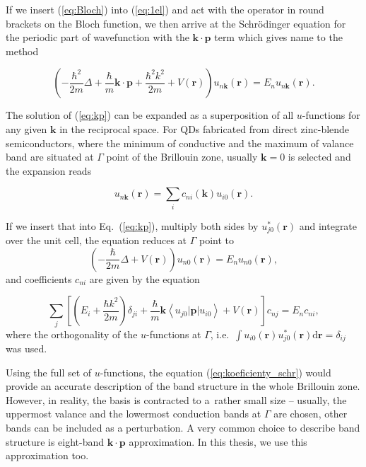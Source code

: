 If we insert (\ref{eq:Bloch}) into (\ref{eq:1el}) and act with the operator in round brackets on the Bloch function, we then arrive at the Schrödinger equation for the periodic part of wavefunction with the $\mathbf{k}\cdot\mathbf{p}$ term which gives name to the method

\begin{equation}
\left(-\frac{\hbar^2}{2m}\Delta+\frac{\hbar}{m}\mathbf{k}\cdot\mathbf{p}+\frac{\hbar^2 k^2}{2m}+V(\mathbf{r})\right)u_{n\mathbf{k}}(\mathbf{r})=E_nu_{n\mathbf{k}}(\mathbf{r}). \label{eq:kp}
\end{equation}

The solution of (\ref{eq:kp}) can be expanded as a superposition of all $u$-functions for any given $\mathbf{k}$ in the reciprocal space. For QDs fabricated from direct zinc-blende semiconductors, where the minimum of conductive and the maximum of valance band are situated at $\Gamma$ point of the Brillouin zone, usually $\mathbf{k}=0$ is selected and the expansion reads

\begin{equation}
\label{eqBlochSuper}
u_{n\mathbf{k}}(\mathbf{r})=\sum_i c_{ni}(\mathbf{k}) u_{i0}(\mathbf{r}).
\end{equation}

If we insert that into Eq.~(\ref{eq:kp}), multiply both sides by $u_{j0}^*(\mathbf{r})$ and integrate over the unit cell, the equation reduces at $\Gamma$ point to 
\begin{equation}
\left(-\frac{\hbar}{2m}\Delta+V(\mathbf{r})\right)u_{n0}(\mathbf{r})=E_nu_{n0}(\mathbf{r}),
\end{equation}
and coefficients $c_{ni}$ are given by the equation

\begin{equation}
\sum_j\left[\left(E_i+\frac{\hbar k^2}{2m}\right) \delta_{ji}+\frac{\hbar}{m}\mathbf{k}\left<u_{j0}|\mathbf{p}|u_{i0}\right> +V(\mathbf{r}) \right]c_{nj}=E_nc_{ni}, \label{eq:koeficienty_schr}
\end{equation}
where the orthogonality of the $u$-functions at $\Gamma$, i.e.~$\int u_{i0}(\mathbf{r})u_{j0}^*(\mathbf{r})\mathrm{d}\mathbf{r}=\delta_{ij}$ was used.

Using the full set of $u$-functions, the equation (\ref{eq:koeficienty_schr}) would provide an accurate description of the band structure in the whole Brillouin zone. However, in reality, the basis is contracted to a~rather small size -- usually, the uppermost valance and the lowermost conduction bands at $\Gamma$ are chosen, other bands can be included as a perturbation. A very common choice to describe band structure is eight-band $\mathbf{k\cdot p}$ approximation. In this thesis, we use this approximation too.

